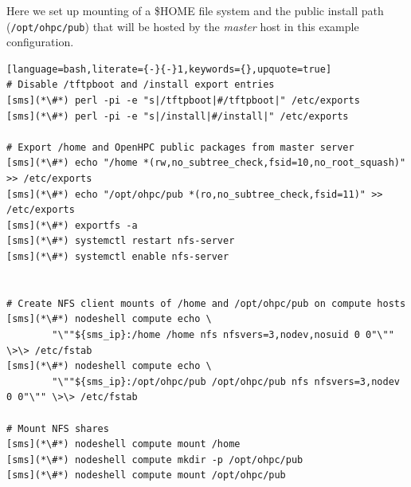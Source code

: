 Here we set up \NFS{}  mounting of a
\$HOME file system and the public \OHPC{} install path (\texttt{/opt/ohpc/pub})
that will be hosted by the {\em master} host in this  example configuration.

\vspace*{0.15cm}
\begin{lstlisting}[language=bash,literate={-}{-}1,keywords={},upquote=true]
# Disable /tftpboot and /install export entries
[sms](*\#*) perl -pi -e "s|/tftpboot|#/tftpboot|" /etc/exports
[sms](*\#*) perl -pi -e "s|/install|#/install|" /etc/exports

# Export /home and OpenHPC public packages from master server
[sms](*\#*) echo "/home *(rw,no_subtree_check,fsid=10,no_root_squash)" >> /etc/exports
[sms](*\#*) echo "/opt/ohpc/pub *(ro,no_subtree_check,fsid=11)" >> /etc/exports
[sms](*\#*) exportfs -a
[sms](*\#*) systemctl restart nfs-server
[sms](*\#*) systemctl enable nfs-server


# Create NFS client mounts of /home and /opt/ohpc/pub on compute hosts
[sms](*\#*) nodeshell compute echo \
        "\""${sms_ip}:/home /home nfs nfsvers=3,nodev,nosuid 0 0"\"" \>\> /etc/fstab
[sms](*\#*) nodeshell compute echo \
        "\""${sms_ip}:/opt/ohpc/pub /opt/ohpc/pub nfs nfsvers=3,nodev 0 0"\"" \>\> /etc/fstab

# Mount NFS shares
[sms](*\#*) nodeshell compute mount /home
[sms](*\#*) nodeshell compute mkdir -p /opt/ohpc/pub
[sms](*\#*) nodeshell compute mount /opt/ohpc/pub

\end{lstlisting}

